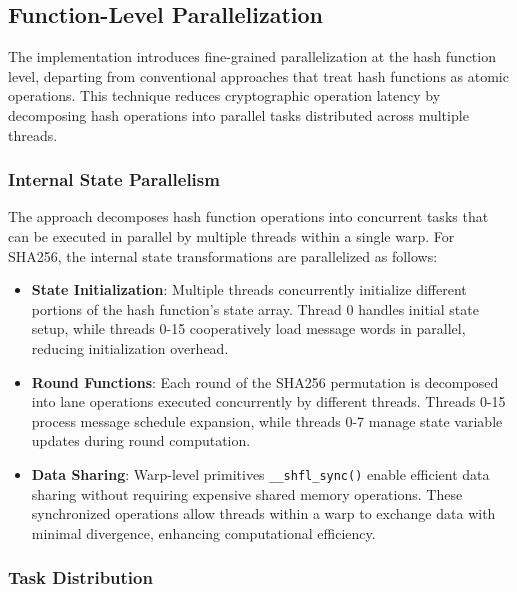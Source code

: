 \documentclass[journal]{IEEEtran}
\begin{document}
\subsection{Function-Level Parallelization}

The implementation introduces fine-grained parallelization at the hash function level, departing from conventional approaches that treat hash functions as atomic operations. This technique reduces cryptographic operation latency by decomposing hash operations into parallel tasks distributed across multiple threads.

\subsubsection{Internal State Parallelism}


The approach decomposes hash function operations into concurrent tasks that can be executed in parallel by multiple threads within a single warp. For SHA256, the internal state transformations are parallelized as follows:

\begin{itemize}
  \item \textbf{State Initialization}: Multiple threads concurrently initialize different portions of the hash function's state array. Thread 0 handles initial state setup, while threads 0-15 cooperatively load message words in parallel, reducing initialization overhead.

  \item \textbf{Round Functions}: Each round of the SHA256 permutation is decomposed into lane operations executed concurrently by different threads. Threads 0-15 process message schedule expansion, while threads 0-7 manage state variable updates during round computation.

  \item \textbf{Data Sharing}: Warp-level primitives  \texttt{\_\_shfl\_sync()} enable efficient data sharing without requiring expensive shared memory operations. These synchronized operations allow threads within a warp to exchange data with minimal divergence, enhancing computational efficiency.
\end{itemize}

\subsubsection{Task Distribution }
\end{document}
